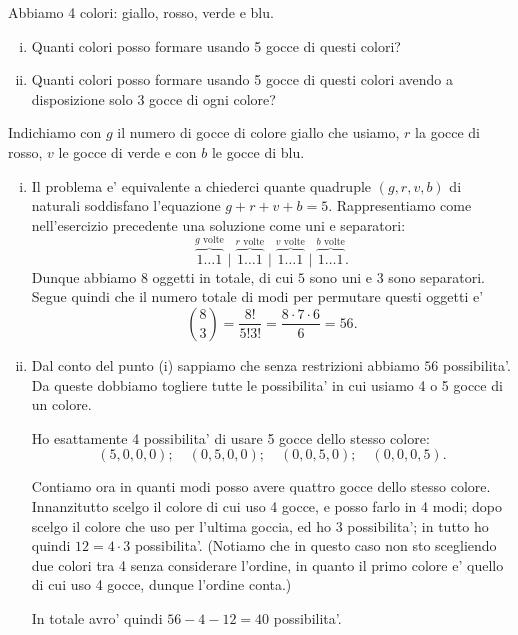 \begin{example}
    Abbiamo 4 colori: giallo, rosso, verde e blu. \begin{enumerate}
        [(i)]
        \item Quanti colori posso formare usando 5 gocce di questi colori?
        \item Quanti colori posso formare usando 5 gocce di questi colori avendo a disposizione solo 3 gocce di ogni colore?
    \end{enumerate}
\end{example}
\begin{solution} Indichiamo con $g$ il numero di gocce di colore giallo che usiamo, $r$ la gocce di rosso, $v$ le gocce di verde e con $b$ le gocce di blu.
    \begin{enumerate}[(i)]
        \item Il problema e' equivalente a chiederci quante quadruple $(g, r, v, b)$ di naturali soddisfano l'equazione $g + r + v + b = 5$. Rappresentiamo come nell'esercizio precedente una soluzione come uni e separatori: \[
            \overbrace{1 \dots 1}^{g \text{ volte}} \mid \overbrace{1 \dots 1}^{r \text{ volte}} \mid \overbrace{1 \dots 1}^{v \text{ volte}} \mid \overbrace{1 \dots 1}^{b \text{ volte}}.
        \] Dunque abbiamo $8$ oggetti in totale, di cui $5$ sono uni e $3$ sono separatori. Segue quindi che il numero totale di modi per permutare questi oggetti e' \[
            \binom{8}{3} = \frac{8!}{5!3!} = \frac{8\cdot 7 \cdot 6}{6} = 56.
        \]
        \item Dal conto del punto (i) sappiamo che senza restrizioni abbiamo $56$ possibilita'. Da queste dobbiamo togliere tutte le possibilita' in cui usiamo 4 o 5 gocce di un colore.
     
        Ho esattamente 4 possibilita' di usare 5 gocce dello stesso colore: \[
            (5, 0, 0, 0); \quad (0, 5, 0, 0); \quad (0, 0, 5, 0); \quad (0, 0, 0, 5).
        \] 

        Contiamo ora in quanti modi posso avere quattro gocce dello stesso colore. Innanzitutto scelgo il colore di cui uso 4 gocce, e posso farlo in 4 modi; dopo scelgo il colore che uso per l'ultima goccia, ed ho 3 possibilita'; in tutto ho quindi $12 = 4 \cdot 3$ possibilita'. (Notiamo che in questo caso non sto scegliendo due colori tra 4 senza considerare l'ordine, in quanto il primo colore e' quello di cui uso 4 gocce, dunque l'ordine conta.)

        In totale avro' quindi $56 - 4 - 12 = 40$ possibilita'.
    \end{enumerate}
\end{solution}


